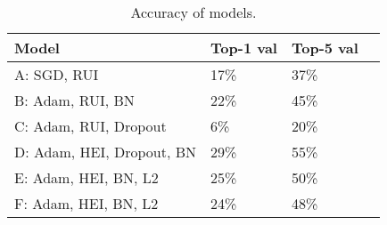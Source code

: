 

\begin{table}[htbp]
\begin{center}
\begin{tabular}{|l|l|l|l|}
\hline
\textbf{Model} & \textbf{Top-1 val} & \textbf{Top-5 val}  \\
\hline
          A: SGD, RUI                &   17\%  		  &  37\% \\
          B: Adam, RUI, BN           &   22\%  		  &  45\% \\
          C: Adam, RUI, Dropout      &   6\%      	&  20\% \\
          D: Adam, HEI, Dropout, BN  &   29\%  	    &  55\% \\
          E: Adam, HEI, BN, L2       &   25\%       &  50\% \\
          F: Adam, HEI, BN, L2       &   24\%       &  48\% \\

\hline
\end{tabular}
\caption[]
{\small
Accuracy of models.
}
\label{table:accuracy}
\end{center}
\end{table}
